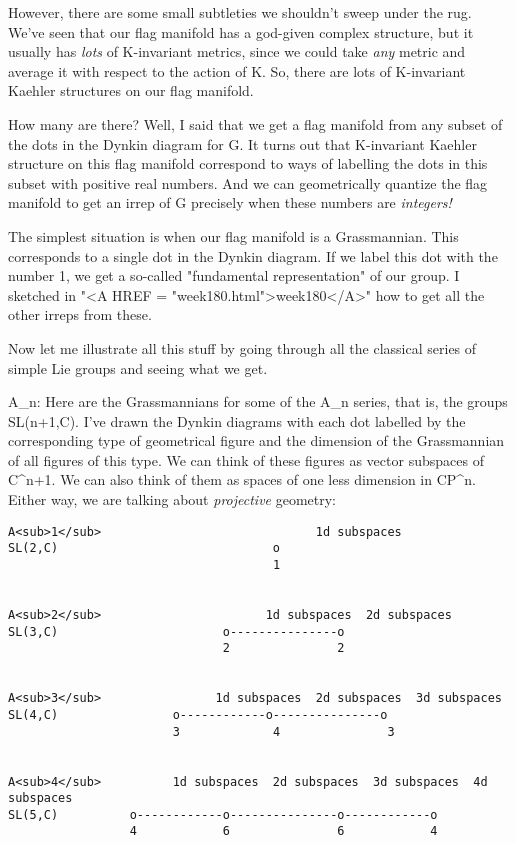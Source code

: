 However, there are some small subtleties we shouldn't sweep under the
rug.  We've seen that our flag manifold has a god-given complex
structure, but it usually has \emph{lots} of K-invariant metrics, since we
could take \emph{any} metric and average it with respect to the action of K. 
So, there are lots of K-invariant Kaehler structures on our flag manifold.

How many are there?  Well, I said that we get a flag manifold from any
subset of the dots in the Dynkin diagram for G.  It turns out that
K-invariant Kaehler structure on this flag manifold correspond to ways
of labelling the dots in this subset with positive real numbers.  And 
we can geometrically quantize the flag manifold to get an irrep of G
precisely when these numbers are \emph{integers!}

The simplest situation is when our flag manifold is a Grassmannian.
This corresponds to a single dot in the Dynkin diagram.  If we label
this dot with the number 1, we get a so-called "fundamental
representation" of our group.  I sketched in "<A HREF = "week180.html">week180</A>" how to get all
the other irreps from these.

Now let me illustrate all this stuff by going through all the classical
series of simple Lie groups and seeing what we get.  

A_{n}: Here are the Grassmannians for some of the A_{n} series,
that is, the groups SL(n+1,C).  I've drawn the Dynkin diagrams with each
dot labelled by the corresponding type of geometrical figure and the
dimension of the Grassmannian of all figures of this type.  We can think
of these figures as vector subspaces of C^{n+1}.  We can also think of
them as spaces of one less dimension in CP^{n}.  Either way, we are
talking about \emph{projective} geometry:


\begin{verbatim}
A<sub>1</sub>                              1d subspaces
SL(2,C)                              o
                                     1


A<sub>2</sub>                       1d subspaces  2d subspaces
SL(3,C)                       o---------------o
                              2               2


A<sub>3</sub>                1d subspaces  2d subspaces  3d subspaces
SL(4,C)                o------------o---------------o
                       3             4               3


A<sub>4</sub>          1d subspaces  2d subspaces  3d subspaces  4d subspaces
SL(5,C)          o------------o---------------o------------o
                 4            6               6            4
\end{verbatim}
    
